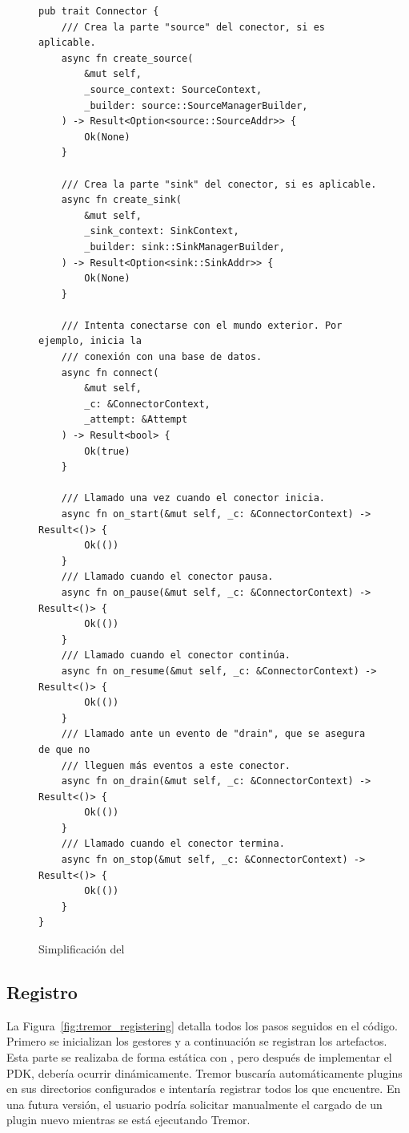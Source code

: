 \begin{figure}[h]
    \centering
    \begin{verbatim}
pub trait Connector {
    /// Crea la parte "source" del conector, si es aplicable.
    async fn create_source(
        &mut self,
        _source_context: SourceContext,
        _builder: source::SourceManagerBuilder,
    ) -> Result<Option<source::SourceAddr>> {
        Ok(None)
    }

    /// Crea la parte "sink" del conector, si es aplicable.
    async fn create_sink(
        &mut self,
        _sink_context: SinkContext,
        _builder: sink::SinkManagerBuilder,
    ) -> Result<Option<sink::SinkAddr>> {
        Ok(None)
    }

    /// Intenta conectarse con el mundo exterior. Por ejemplo, inicia la
    /// conexión con una base de datos.
    async fn connect(
        &mut self,
        _c: &ConnectorContext,
        _attempt: &Attempt
    ) -> Result<bool> {
        Ok(true)
    }

    /// Llamado una vez cuando el conector inicia.
    async fn on_start(&mut self, _c: &ConnectorContext) -> Result<()> {
        Ok(())
    }
    /// Llamado cuando el conector pausa.
    async fn on_pause(&mut self, _c: &ConnectorContext) -> Result<()> {
        Ok(())
    }
    /// Llamado cuando el conector continúa.
    async fn on_resume(&mut self, _c: &ConnectorContext) -> Result<()> {
        Ok(())
    }
    /// Llamado ante un evento de "drain", que se asegura de que no
    /// lleguen más eventos a este conector.
    async fn on_drain(&mut self, _c: &ConnectorContext) -> Result<()> {
        Ok(())
    }
    /// Llamado cuando el conector termina.
    async fn on_stop(&mut self, _c: &ConnectorContext) -> Result<()> {
        Ok(())
    }
}
    \end{verbatim}
    \caption{Simplificación del \trait {}}%
    \label{fig:tremor_connector_trait}
\end{figure}

\subsection{Registro}

La Figura~\ref{fig:tremor_registering} detalla todos los pasos seguidos en el
código. Primero se inicializan los gestores y a continuación se registran los
artefactos. Esta parte se realizaba de forma estática con
, pero después de implementar el PDK, debería
ocurrir dinámicamente. Tremor buscaría automáticamente plugins en sus
directorios configurados e intentaría registrar todos los que encuentre. En una
futura versión, el usuario podría solicitar manualmente el cargado de un plugin
nuevo mientras se está ejecutando Tremor.

